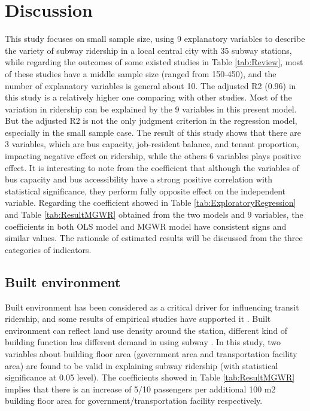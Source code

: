 \documentclass[utf8]{article}
\begin{document}
%
\section{Discussion}
\indent

This study focuses on small sample size, using 9 explanatory variables to describe the variety of subway ridership in a local central city with 35 subway stations, while regarding the outcomes of some existed studies in Table \ref{tab:Review}, most of these studies have a middle sample size (ranged from 150-450), and the number of explanatory variables is general about 10. The adjusted R2 (0.96) in this study is a relatively higher one comparing with other studies. Most of the variation in ridership can be explained by the 9 variables in this present model. But the adjusted R2 is not the only judgment criterion in the regression model, especially in the small sample case. The result of this study shows that there are 3 variables, which are bus capacity, job-resident balance, and tenant proportion, impacting negative effect on ridership, while the others 6 variables plays positive effect. It is interesting to note from the coefficient that although the variables of bus capacity and bus accessibility have a strong positive correlation with statistical significance, they perform fully opposite effect on the independent variable. Regarding the coefficient showed in Table \ref{tab:ExploratoryRegression} and Table \ref{tab:ResultMGWR} obtained from the two models and 9 variables, the coefficients in both OLS model and MGWR model have consistent signs and similar values. The rationale of estimated results will be discussed from the three categories of indicators.

%
\subsection{Built environment}
\indent

Built environment has been considered as a critical driver for influencing transit ridership, and some results of empirical studies have supported it \cite{Sohn2010,Chakraborty2013,Zhao2013}. Built environment can reflect land use density around the station, different kind of building function has different demand in using subway \cite{Chakraborty2013}. In this study, two variables about building floor area (government area and transportation facility area) are found to be valid in explaining subway ridership (with statistical significance at 0.05 level). The coefficients showed in Table \ref{tab:ResultMGWR} implies that there is an increase of 5/10 passengers per additional 100 m2 building floor area for government/transportation facility respectively. 
\end{document}
